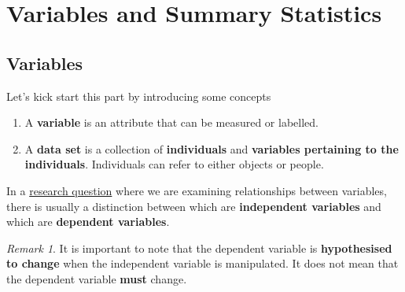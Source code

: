 \documentclass[math,code]{amznotes}
\theoremstyle{remark}
\newtheorem*{remark}{Remark}
\begin{document}
\section{Variables and Summary Statistics}
\subsection{Variables}
Let's kick start this part by introducing some concepts
\begin{enumerate}
    \item A \textbf{variable} is an attribute that can be measured or labelled.
    \item A \textbf{data set} is a collection of \textbf{individuals} and \textbf{variables pertaining to the individuals}. Individuals can refer to either objects or people.
\end{enumerate}
In a \hyperref[dfn:dfn-research-question]{research question} where we are examining relationships between variables, there is usually a distinction between which are \textbf{independent variables} and which are \textbf{dependent variables}.
\begin{notebox}
    \begin{remark}
        It is important to note that the dependent variable is \textbf{hypothesised to change} when the independent variable is manipulated. It does not mean that the dependent variable \textbf{must} change.
    \end{remark}
\end{notebox}
\end{document}
